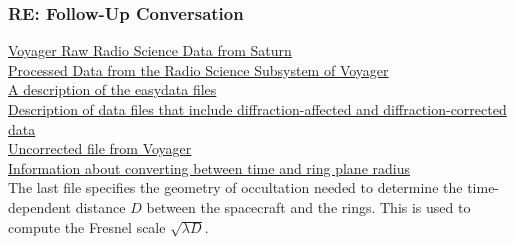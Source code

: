 \documentclass[crop=false,class=book]{standalone}
\begin{document}
\subsubsection{\footnotesize RE: Follow-Up Conversation}
\href{https://nssdc.gsfc.nasa.gov/nmc/datasetDisplay.do?id=PSPA-00411}{Voyager Raw Radio Science Data from Saturn}\\
\href{https://pds-rings.seti.org/voyager/rss/index.html}{Processed Data from the Radio Science Subsystem of Voyager}\\
\href{https://pds-rings.seti.org/volumes/VG_28xx_peer_review/VG_2803/S_RINGS/EASYDATA/DATAINFO.TXT}{A description of the easydata files}\\
\href{https://pds-rings.seti.org/volumes/VG_28xx_peer_review/VG_2803/S_RINGS/EDITDATA/DATAINFO.TXT}{Description of data files that include diffraction-affected and diffraction-corrected data}\\
\href{https://pds-rings.seti.org/volumes/VG_28xx_peer_review/VG_2803/S_RINGS/EDITDATA/RS1D1XUI.LBL}{Uncorrected file from Voyager}\\
\href{https://pds-rings.seti.org/volumes/VG_28xx_peer_review/VG_2803/S_RINGS/GEOMETRY/GEOMINFO.TXT}{Information about converting between time and ring plane radius}\\
The last file specifies the geometry of occultation needed to determine the time-dependent distance $D$ between the spacecraft and the rings. This is used to compute the Fresnel scale $\sqrt{\lambda D}$.
\end{document}
